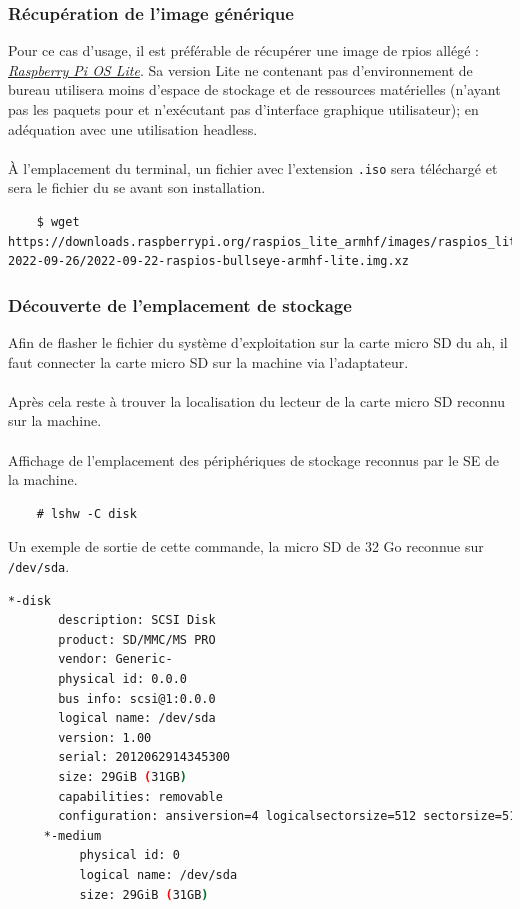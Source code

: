 \documentclass[a4paper]{article}
\begin{document}
\subsubsection{Récupération de l'image générique}
Pour ce cas d'usage, il est préférable de récupérer une image de \gls{rpios} allégé : \href{https://www.raspberrypi.com/software/operating-systems/}{\textit{Raspberry Pi OS Lite}}. Sa version Lite ne contenant pas d'environnement de bureau utilisera moins d'espace de stockage et de ressources matérielles (n'ayant pas les paquets pour et n'exécutant pas d'interface graphique utilisateur); en adéquation avec une utilisation headless.\\\\À l'emplacement du terminal, un fichier avec l'extension \verb|.iso| sera téléchargé et sera le fichier du \acrshort{se} avant son installation.
\begin{lstlisting}
    $ wget https://downloads.raspberrypi.org/raspios_lite_armhf/images/raspios_lite_armhf-2022-09-26/2022-09-22-raspios-bullseye-armhf-lite.img.xz
\end{lstlisting}
\subsubsection{Découverte de l'emplacement de stockage}
\label{sec:sec01}
Afin de flasher le fichier du système d'exploitation sur la carte micro SD du \acrshort{ah}, il faut connecter la carte micro SD sur la machine via l'adaptateur.\\\\Après cela reste à trouver la localisation du lecteur de la carte micro SD reconnu sur la machine.\\\\Affichage de l'emplacement des périphériques de stockage reconnus par le SE de la machine.
\begin{lstlisting}
    # lshw -C disk
\end{lstlisting}
\noindent Un exemple de sortie de cette commande, la micro SD de 32 Go reconnue sur \verb|/dev/sda|.
\begin{lstlisting}[language=bash]
  *-disk
       description: SCSI Disk
       product: SD/MMC/MS PRO
       vendor: Generic-
       physical id: 0.0.0
       bus info: scsi@1:0.0.0
       logical name: /dev/sda
       version: 1.00
       serial: 2012062914345300
       size: 29GiB (31GB)
       capabilities: removable
       configuration: ansiversion=4 logicalsectorsize=512 sectorsize=512
     *-medium
          physical id: 0
          logical name: /dev/sda
          size: 29GiB (31GB)
\end{lstlisting}
\end{document}
